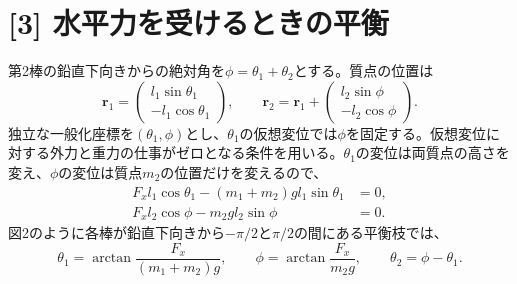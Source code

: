 \documentclass[11pt,a4paper]{article}
\begin{document}
\section*{[3] 水平力を受けるときの平衡}
第2棒の鉛直下向きからの絶対角を$\phi=\theta_1+\theta_2$とする。質点の位置は
\begin{equation}
  \boldsymbol r_1=\begin{pmatrix}l_1\sin\theta_1\\-l_1\cos\theta_1\end{pmatrix},
  \qquad
  \boldsymbol r_2=\boldsymbol r_1+
  \begin{pmatrix}l_2\sin\phi\\-l_2\cos\phi\end{pmatrix}.
\end{equation}
独立な一般化座標を$(\theta_1,\phi)$とし、$\theta_1$の仮想変位では$\phi$を固定する。仮想変位に対する外力と重力の仕事がゼロとなる条件を用いる。$\theta_1$の変位は両質点の高さを変え、$\phi$の変位は質点$m_2$の位置だけを変えるので、
\begin{align}
  F_xl_1\cos\theta_1-(m_1+m_2)gl_1\sin\theta_1&=0,\\
  F_xl_2\cos\phi-m_2gl_2\sin\phi&=0.
\end{align}
図2のように各棒が鉛直下向きから$-\pi/2$と$\pi/2$の間にある平衡枝では、
\begin{equation}
  \boxed{\theta_1=\arctan\frac{F_x}{(m_1+m_2)g}},\qquad
  \boxed{\phi=\arctan\frac{F_x}{m_2g}},\qquad
  \boxed{\theta_2=\phi-\theta_1}.
\end{equation}
\end{document}
